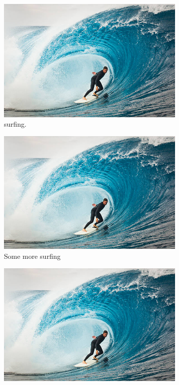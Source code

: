 \documentclass{article}
\begin{document}
	\begin{figure}[h!]
		\centering
		\begin{subfigure}[b]{0.3\linewidth}
			\includegraphics[width=\linewidth]{surf.jpg}
			\caption{surfing.}
		\end{subfigure}
		\begin{subfigure}[b]{0.3\linewidth}
			\includegraphics[width=\linewidth]{surf.jpg}
			\caption{Some more surfing}
		\end{subfigure}
		\begin{subfigure}[b]{0.3\linewidth}
			\includegraphics[width=\linewidth]{surf.jpg}

\end{subfigure}
\end{figure}
\end{document}
